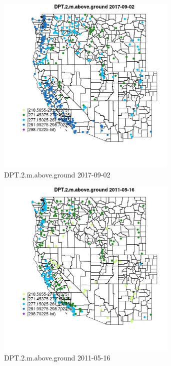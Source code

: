 \begin{figure} 
\centering  
\includegraphics[width=0.77\textwidth]{Code_Outputs/Report_ML_input_PM25_Step4_part_e_de_duplicated_aves_compiled_2019-05-20wNAs_MapObsDPT2maboveground2017-09-02.jpg} 
\caption{\label{fig:Report_ML_input_PM25_Step4_part_e_de_duplicated_aves_compiled_2019-05-20wNAsMapObsDPT2maboveground2017-09-02}DPT.2.m.above.ground 2017-09-02} 
\end{figure} 
 

\begin{figure} 
\centering  
\includegraphics[width=0.77\textwidth]{Code_Outputs/Report_ML_input_PM25_Step4_part_e_de_duplicated_aves_compiled_2019-05-20wNAs_MapObsDPT2maboveground2011-05-16.jpg} 
\caption{\label{fig:Report_ML_input_PM25_Step4_part_e_de_duplicated_aves_compiled_2019-05-20wNAsMapObsDPT2maboveground2011-05-16}DPT.2.m.above.ground 2011-05-16} 
\end{figure} 
 

